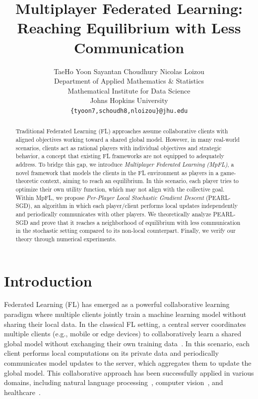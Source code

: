 \documentclass{article}
\title{Multiplayer Federated Learning: \\Reaching Equilibrium with Less Communication}
\author{
  TaeHo Yoon \quad \quad Sayantan Choudhury \quad \quad Nicolas Loizou\\
  Department of Applied Mathematics \& Statistics\\
  Mathematical Institute for Data Science \\
  Johns Hopkins University\\
  \texttt{\{tyoon7,schoudh8,nloizou\}@jhu.edu} 
}
\newcommand{\algname}[1]{{\color{PineGreen}\sf  #1}\xspace}
\newcommand{\abbvname}{\algname{PEARL-SGD}}
\theoremstyle{plain}
\theoremstyle{remark}
\begin{document}
\maketitle

\begin{abstract}
Traditional Federated Learning (FL) approaches assume collaborative clients with aligned objectives working toward a shared global model. However, in many real-world scenarios, clients act as rational players with individual objectives and strategic behavior, a concept that existing FL frameworks are not equipped to adequately address. To bridge this gap, we introduce \textit{Multiplayer Federated Learning (MpFL)}, a novel framework that models the clients in the FL environment as players in a game-theoretic context, aiming to reach an equilibrium. In this scenario, each player tries to optimize their own utility function, which may not align with the collective goal.
Within MpFL, we propose \emph{Per-Player Local Stochastic Gradient Descent}
(\abbvname), an algorithm in which each player/client performs local updates independently and periodically communicates with other players.
We theoretically analyze \abbvname and prove that it reaches a neighborhood of equilibrium with less communication in the stochastic setting compared to its non-local counterpart.
Finally, we verify our theory through numerical experiments.
\end{abstract}

\section{Introduction}
Federated Learning (FL) has emerged as a powerful collaborative learning paradigm where multiple clients jointly train a machine learning model without sharing their local data. In the classical FL setting, a central server coordinates multiple clients (e.g., mobile or edge devices) to collaboratively learn a shared global model without exchanging their own training data~\citep{kairouz2021advances, konevcny2016federated,mcmahan2017communication, li2020federated}. In this scenario, each client performs local computations on its private data and periodically communicates model updates to the server, which aggregates them to update the global model. This collaborative approach has been successfully applied in various domains, including natural language processing~\citep{liu2021federated,hard2018federated}, computer vision~\citep{LiuHuangLuoHuangLiuChenFengChenYuYang2020_fedvision, li2021survey}, and healthcare~\citep{antunes2022federated, xu2021federated}.
\end{document}
